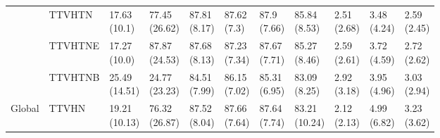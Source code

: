 \begin{table}
\begin{tabular}{lllllllllll}
       & TTVHTN &   \makecell{17.63\\(10.1)} &  \makecell{77.45\\(26.62)} &   \makecell{87.81\\(8.17)} &   \makecell{87.62\\(7.3)} &   \makecell{87.9\\(7.66)} &   \makecell{85.84\\(8.53)} &      \makecell{2.51\\(2.68)} &  \makecell{3.48\\(4.24)} &  \makecell{2.59\\(2.45)} \\
       & TTVHTNE &   \makecell{17.27\\(10.0)} &  \makecell{87.87\\(24.53)} &   \makecell{87.68\\(8.13)} &  \makecell{87.23\\(7.34)} &  \makecell{87.67\\(7.71)} &   \makecell{85.27\\(8.46)} &      \makecell{2.59\\(2.61)} &  \makecell{3.72\\(4.59)} &  \makecell{2.72\\(2.62)} \\
       & TTVHTNB &  \makecell{25.49\\(14.51)} &  \makecell{24.77\\(23.23)} &   \makecell{84.51\\(7.99)} &  \makecell{86.15\\(7.02)} &  \makecell{85.31\\(6.95)} &   \makecell{83.09\\(8.25)} &      \makecell{2.92\\(3.18)} &  \makecell{3.95\\(4.96)} &  \makecell{3.03\\(2.94)} \\
Global & TTVHN &  \makecell{19.21\\(10.13)} &  \makecell{76.32\\(26.87)} &   \makecell{87.52\\(8.04)} &  \makecell{87.66\\(7.64)} &  \makecell{87.64\\(7.74)} &  \makecell{83.21\\(10.24)} &      \makecell{2.12\\(2.13)} &  \makecell{4.99\\(6.82)} &  \makecell{3.23\\(3.62)} \\

\end{tabular}
\end{table}

